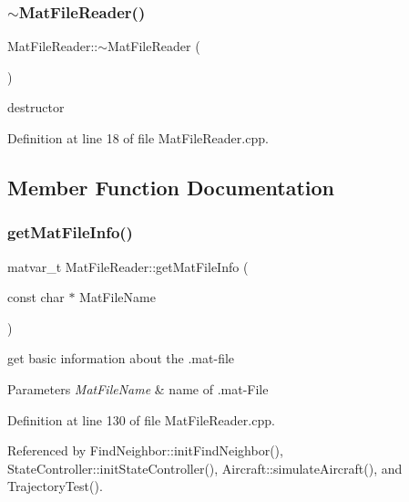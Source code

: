 \subsubsection{\texorpdfstring{$\sim$\+Mat\+File\+Reader()}{~MatFileReader()}}
{\footnotesize\ttfamily Mat\+File\+Reader\+::$\sim$\+Mat\+File\+Reader (\begin{DoxyParamCaption}{ }\end{DoxyParamCaption})}



destructor 



Definition at line 18 of file Mat\+File\+Reader.\+cpp.



\subsection{Member Function Documentation}
\mbox{\label{class_mat_file_reader_a358cf61a557c68d56a2ee9f23773e46c}} 
\subsubsection{\texorpdfstring{get\+Mat\+File\+Info()}{getMatFileInfo()}}
{\footnotesize\ttfamily matvar\+\_\+t Mat\+File\+Reader\+::get\+Mat\+File\+Info (\begin{DoxyParamCaption}\item[{const char $\ast$}]{Mat\+File\+Name }\end{DoxyParamCaption})}



get basic information about the .mat-\/file 


\begin{DoxyParams}{Parameters}
{\em Mat\+File\+Name} & name of .mat-\/\+File \\
\hline
\end{DoxyParams}


Definition at line 130 of file Mat\+File\+Reader.\+cpp.



Referenced by Find\+Neighbor\+::init\+Find\+Neighbor(), State\+Controller\+::init\+State\+Controller(), Aircraft\+::simulate\+Aircraft(), and Trajectory\+Test().

\mbox{\label{class_mat_file_reader_ab5269caf1a7e2c213f6daf56c7d14321}} 
